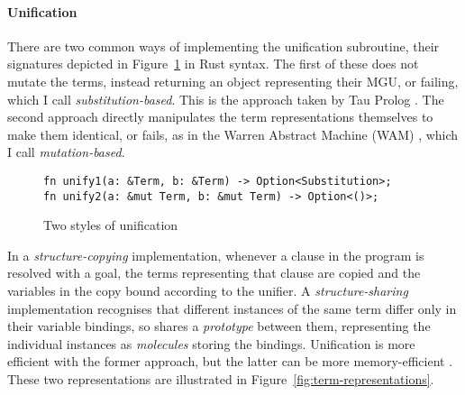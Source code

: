 \paragraph{Unification} There are two common ways of implementing the unification subroutine, their signatures depicted in Figure~\ref{fig:unification-impl} in Rust syntax. The first of these does not mutate the terms, instead returning an object representing their MGU, or failing, which I call \emph{substitution-based}. This is the approach taken by Tau Prolog \cite{riazaTauPrologProlog2024}. The second approach directly manipulates the term representations themselves to make them identical, or fails, as in the Warren Abstract Machine (WAM) \cite{warrenAbstractPrologInstruction1983}, which I call \emph{mutation-based}.

\begin{figure}[H]
\centering
\begin{verbatim}
fn unify1(a: &Term, b: &Term) -> Option<Substitution>;
fn unify2(a: &mut Term, b: &mut Term) -> Option<()>;
\end{verbatim}
\caption{Two styles of unification}
\label{fig:unification-impl}
\end{figure}

In a \emph{structure-copying} implementation, whenever a clause in the program is resolved with a goal, the terms representing that clause are copied and the variables in the copy bound according to the unifier. A \emph{structure-sharing} implementation recognises that different instances of the same term differ only in their variable bindings, so shares a \emph{prototype} between them, representing the individual instances as \emph{molecules} storing the bindings. Unification is more efficient with the former approach, but the latter can be more memory-efficient \cite{linewtermrepresentation1998}. These two representations are illustrated in Figure~\ref{fig:term-representations}.

